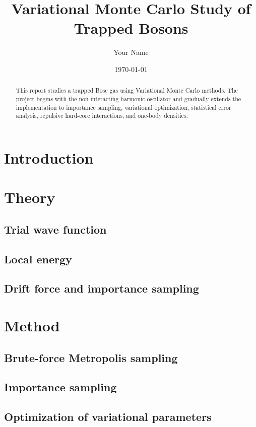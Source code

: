 \documentclass[11pt,a4paper]{article}
\title{Variational Monte Carlo Study of Trapped Bosons}
\author{Your Name}
\date{\today}
\begin{document}
\maketitle

\begin{abstract}
This report studies a trapped Bose gas using Variational Monte Carlo methods.
The project begins with the non-interacting harmonic oscillator and gradually
extends the implementation to importance sampling, variational optimization,
statistical error analysis, repulsive hard-core interactions, and one-body
densities.
\end{abstract}

\section{Introduction}

\section{Theory}

\subsection{Trial wave function}

\subsection{Local energy}

\subsection{Drift force and importance sampling}

\section{Method}

\subsection{Brute-force Metropolis sampling}

\subsection{Importance sampling}

\subsection{Optimization of variational parameters}
\end{document}
